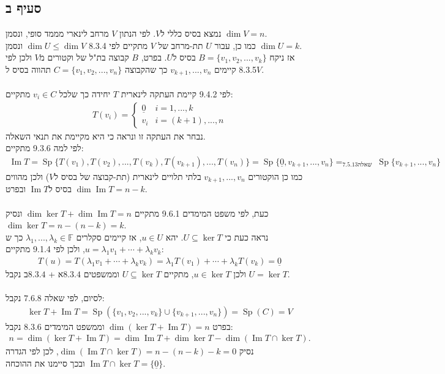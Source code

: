 \documentclass{article}
\DeclareMathOperator*{\equals}{=}
\DeclareMathOperator\Sp{Sp}
\DeclareMathOperator\Image{Im}
\def\field{\mathbb{F}}
\def\zerovec{\underline{0}}
\begin{document}
\subsection*{סעיף ב}
נמצא בסיס כללי ל$V$. לפי הנתון $V$ מרחב לינארי מממד סופי, ונסמן $\dim V=n$.  \\
כמו כן, עבור $U$ תת-מרחב של $V$ מתקיים לפי 8.3.4 $\dim U\leq \dim V$ ונסמן $\dim U=k$. \\
אז ניקח $B=\{v_1, v_2, ..., v_k\}$ בסיס ל$U$. בפרט, $B$ קבוצה בת"ל של וקטורים מ$V$ ולכן לפי 8.3.5 קיימים $v_{k+1}, ..., v_{n}$ כך שהקבוצה $C=\{v_1, v_2, ..., v_n\}$ תהווה בסיס ל$V$.
\\\\
לפי 9.4.2 קיימת העתקה לינארית $T$ יחידה כך שלכל $v_i\in C$ מתקיים:
\begin{align*}
    T(v_i)=\begin{cases}
        \zerovec & i=1,...,k     \\
        v_i      & i=(k+1),...,n
    \end{cases}
\end{align*}
נבחר את העתקה זו ונראה כי היא מקיימת את תנאי השאלה.\\
לפי למה 9.3.6 מתקיים:
\begin{align*}
    \Image T  =\Sp\{ T(v_1), T(v_2), ..., T(v_k), T(v_{k+1}), ..., T(v_n) \}
    = \Sp\{ \zerovec, v_{k+1}, ..., v_n \}\equals_{7.5.13 \text{שאלה }}
    \Sp\{ v_{k+1}, ..., v_n \}
\end{align*}
כמו כן הוקטורים $v_{k+1},...,v_n$ בלתי תלויים לינארית (תת-קבוצה של בסיס ל$V$) ולכן מהווים בסיס ל$\Image T$ ובפרט $\dim\Image T=n-k$.
\\\\
כעת, לפי משפט המימדים 9.6.1 מתקיים $\dim \ker T + \dim \Image T = n$ ונסיק $\dim \ker T= n-(n-k)=k$. \\
נראה כעת כי $U\subseteq \ker T$. יהא $u\in U$, אז קיימים סקלרים $\lambda_1, ..., \lambda_k\in \field$ כך ש $u=\lambda_1v_1+\cdots+\lambda_kv_k$, ולכן לפי 9.1.4 מתקיים:
\begin{align*}
    T(u) =T(\lambda_1v_1+\cdots+\lambda_kv_k)
    =\lambda_1T(v_1)+\cdots+\lambda_kT(v_k)= \zerovec
\end{align*}
ולכן $u\in \ker T$, מתקיים $U\subseteq \ker T$ וממשפטים $8.3.4$א + $8.3.4$ב נקבל $U=\ker T$.
\\\\
לסיום, לפי שאלה $7.6.8$ נקבל:
\begin{align*}
    \ker T + \Image T= \Sp(\{ v_1, v_2, ..., v_k \}\cup\{ v_{k+1}, ..., v_n \})=\Sp(C)=V
\end{align*}
בפרט $\dim (\ker T + \Image T)=n$ וממשפט המימדים 8.3.6 נקבל:
\begin{align*}
    n = \dim (\ker T + \Image T)= \dim \Image T + \dim \ker T - \dim(\Image T\cap\ker T).
\end{align*}
נסיק $\dim(\Image T\cap\ker T)=n-(n-k)-k=0$, לכן לפי הגדרה $\Image T\cap\ker T=\{\zerovec\}$ ובכך סיימנו את ההוכחה.
\end{document}
